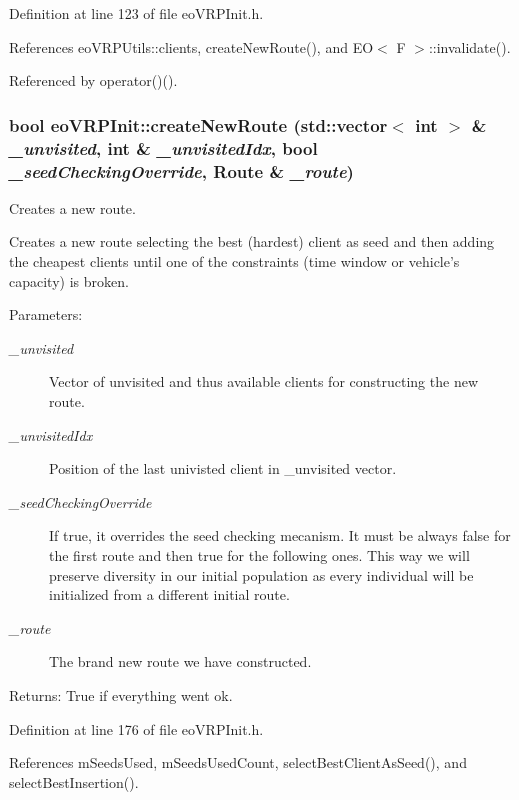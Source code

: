 Definition at line 123 of file eo\-VRPInit.h.

References eo\-VRPUtils::clients, create\-New\-Route(), and EO$<$ F $>$::invalidate().

Referenced by operator()().
\subsubsection{\setlength{\rightskip}{0pt plus 5cm}bool eo\-VRPInit::create\-New\-Route (std::vector$<$ int $>$ \& {\em \_\-unvisited}, int \& {\em \_\-unvisited\-Idx}, bool {\em \_\-seed\-Checking\-Override}, Route \& {\em \_\-route})\hspace{0.3cm}{\tt  [inline, private]}}\label{classeo_v_r_p_init_ff7c0bf38bdd70d6f9d561479ec4f48a}


Creates a new route. 

Creates a new route selecting the best (hardest) client as seed and then adding the cheapest clients until one of the constraints (time window or vehicle's capacity) is broken. \begin{Desc}
\item[Parameters:]
\begin{description}
\item[{\em \_\-unvisited}]Vector of unvisited and thus available clients for constructing the new route. \item[{\em \_\-unvisited\-Idx}]Position of the last univisted client in \_\-unvisited vector. \item[{\em \_\-seed\-Checking\-Override}]If true, it overrides the seed checking mecanism. It must be always false for the first route and then true for the following ones. This way we will preserve diversity in our initial population as every individual will be initialized from a different initial route. \item[{\em \_\-route}]The brand new route we have constructed. \end{description}
\end{Desc}
\begin{Desc}
\item[Returns:]True if everything went ok. \end{Desc}


Definition at line 176 of file eo\-VRPInit.h.

References m\-Seeds\-Used, m\-Seeds\-Used\-Count, select\-Best\-Client\-As\-Seed(), and select\-Best\-Insertion().

